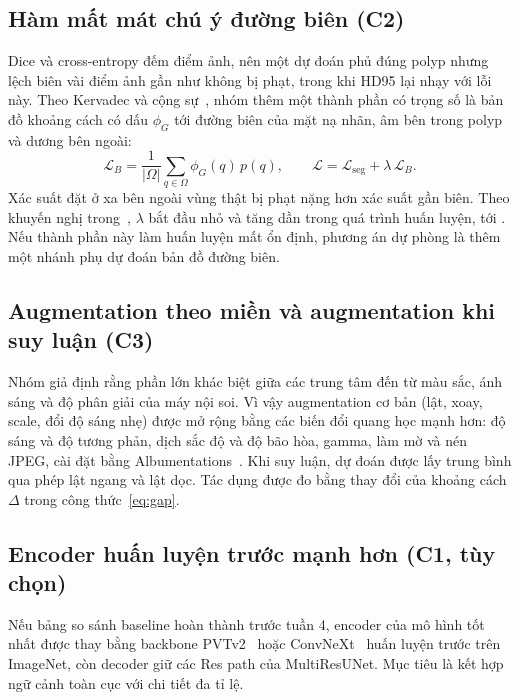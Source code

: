 \documentclass[10pt,twoside]{article}
\begin{document}
\subsection{Hàm mất mát chú ý đường biên (C2)}
Dice và cross-entropy đếm điểm ảnh, nên một dự đoán phủ đúng polyp nhưng lệch biên vài
điểm ảnh gần như không bị phạt, trong khi HD95 lại nhạy với lỗi này. Theo Kervadec và
cộng sự~\cite{kervadec2021boundary}, nhóm thêm một thành phần có trọng số là bản đồ
khoảng cách có dấu $\phi_G$ tới đường biên của mặt nạ nhãn, âm bên trong polyp và
dương bên ngoài:
\begin{equation}\label{eq:boundary}
  \mathcal{L}_{B} = \frac{1}{|\Omega|}\sum_{q\in\Omega}\phi_G(q)\,p(q),
  \qquad
  \mathcal{L} = \mathcal{L}_{\text{seg}} + \lambda\,\mathcal{L}_{B}.
\end{equation}
Xác suất đặt ở xa bên ngoài vùng thật bị phạt nặng hơn xác suất gần biên. Theo khuyến
nghị trong~\cite{kervadec2021boundary}, $\lambda$ bắt đầu nhỏ và tăng dần trong quá
trình huấn luyện, tới . Nếu thành phần này làm huấn luyện mất ổn định,
phương án dự phòng là thêm một nhánh phụ dự đoán bản đồ đường biên.

\subsection{Augmentation theo miền và augmentation khi suy luận (C3)}
Nhóm giả định rằng phần lớn khác biệt giữa các trung tâm đến từ màu sắc, ánh sáng và
độ phân giải của máy nội soi. Vì vậy augmentation cơ bản (lật, xoay, scale, đổi độ
sáng nhẹ) được mở rộng bằng các biến đổi quang học mạnh hơn: độ sáng và độ tương
phản, dịch sắc độ và độ bão hòa, gamma, làm mờ và nén JPEG, cài đặt bằng
Albumentations~\cite{buslaev2020albumentations}. Khi suy luận, dự đoán được lấy trung
bình qua phép lật ngang và lật dọc. Tác dụng được đo bằng thay đổi của khoảng cách
$\Delta$ trong công thức~\eqref{eq:gap}.

\subsection{Encoder huấn luyện trước mạnh hơn (C1, tùy chọn)}
Nếu bảng so sánh baseline hoàn thành trước tuần 4, encoder của mô hình tốt nhất được
thay bằng backbone PVTv2~\cite{wang2022pvtv2} hoặc ConvNeXt~\cite{liu2022convnext} huấn
luyện trước trên ImageNet, còn decoder giữ các Res path của MultiResUNet. Mục tiêu là
kết hợp ngữ cảnh toàn cục với chi tiết đa tỉ lệ.

\end{document}
